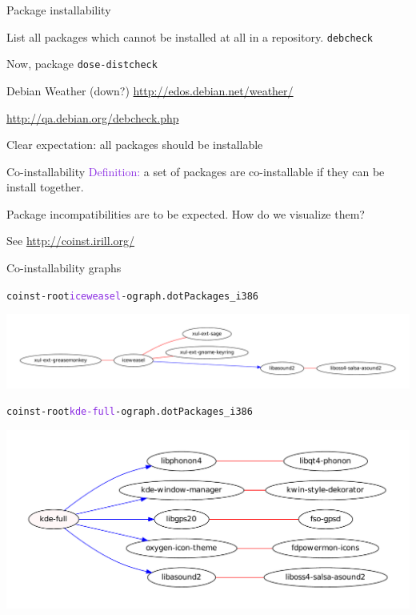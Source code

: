 \documentclass[xcolor={dvipsnames}]{beamer}
\newcommand{\EEE}[1]{\textcolor{BlueViolet}{#1}}
\begin{document}
\begin{frame}{Package installability}

List all packages which cannot be installed at all in a repository.
\texttt{debcheck}

Now, package \texttt{dose-distcheck}

Debian Weather (down?)
\url{http://edos.debian.net/weather/}

\url{http://qa.debian.org/debcheck.php}

Clear expectation: all packages should be installable

\end{frame}

\begin{frame}[fragile]{Co-installability}
\EEE{Definition:} a set of packages are co-installable if they can be install
together.

\vspace{1.5em}
Package incompatibilities are to be expected.
%
How do we visualize them?

See \url{http://coinst.irill.org/}
\end{frame}

\begin{frame}[fragile]{Co-installability graphs}
\begin{alltt}
coinst -root \EEE{iceweasel} -o graph.dot Packages_i386
\end{alltt}
\vspace{-2.5em}
\begin{center}
\includegraphics[width=\linewidth]{figures/iceweasel.pdf}
\end{center}
\vspace{-2em}
\begin{alltt}
coinst -root \EEE{kde-full} -o graph.dot Packages_i386
\end{alltt}
\vspace{-2.5em}
\begin{center}
\includegraphics[width=0.65\linewidth]{figures/kde-full.pdf}
\end{center}
\end{frame}
\end{document}

